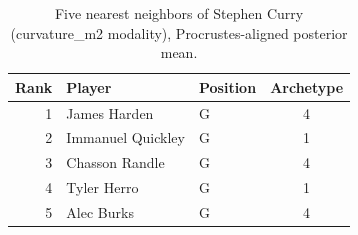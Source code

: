 \begin{table}[htbp]
  \centering\small
  \begin{tabular}{rllc}
    \toprule
    Rank & Player & Position & Archetype \\
    \midrule
    1 & James Harden & G & 4 \\
    2 & Immanuel Quickley & G & 1 \\
    3 & Chasson Randle & G & 4 \\
    4 & Tyler Herro & G & 1 \\
    5 & Alec Burks & G & 4 \\
    \bottomrule
  \end{tabular}
  \caption{Five nearest neighbors of Stephen Curry (curvature_m2 modality), Procrustes-aligned posterior mean.}
  \label{tab:Stephen_Curry_neighbors_curvature_m2}
\end{table}

